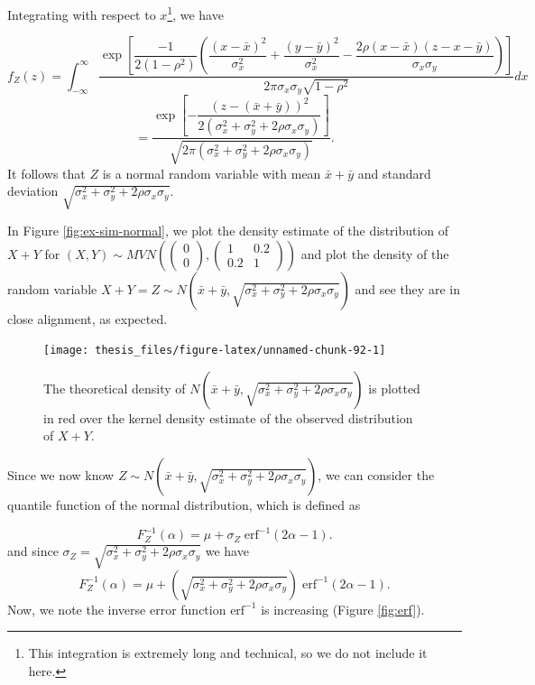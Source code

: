 \documentclass[12pt,twoside]{smiththesis}
\begin{document}
Integrating with respect to \(x\)\footnote{This integration is extremely long and technical, so we do not include it here.}, we have

\[f_Z(z)  = \int_{-\infty}^\infty \dfrac{\exp\left[\dfrac{-1}{2(1-\rho^2)} \left( \dfrac{(x-\bar x)^2}{\sigma_x^2}+\dfrac{(y-\bar y)^2}{\sigma_x^2} - \dfrac{2 \rho (x-\bar x)(z-x-\bar y)}{\sigma_x\sigma_y} \right)\right]}{2\pi \sigma_x \sigma_y \sqrt{1- \rho^2}} dx \]
\[=\dfrac{\exp\left[-\dfrac{(z-(\bar x + \bar y ))^2}{2(\sigma^2_x+\sigma^2_y + 2\rho \sigma_x \sigma_y)}\right]}{\sqrt{2\pi(\sigma_x^2 + \sigma_y^2 + 2\rho \sigma_x \sigma_y)}}.\]
It follows that \(Z\) is a normal random variable with mean \(\bar x + \bar y\) and standard deviation \(\sqrt{\sigma_x^2 +\sigma_y^2 + 2 \rho \sigma_x \sigma_y }\).

In Figure \ref{fig:ex-sim-normal}, we plot the density estimate of the distribution of \(X+Y\) for \((X,Y) \sim MVN\left( \begin{pmatrix} 0\\0 \end{pmatrix}, \begin{pmatrix} 1 & 0.2 \\0.2 & 1 \end{pmatrix}\right)\) and plot the density of the random variable \(X+Y = Z \sim N\left(\bar x + \bar y,\sqrt{\sigma_x^2 +\sigma_y^2 + 2 \rho \sigma_x \sigma_y }\right)\) and see they are in close alignment, as expected.
\begin{figure}

{\centering \texttt{[image: thesis\_files/figure-latex/unnamed-chunk-92-1]} 

}

\caption{\label{fig:ex-sim-normal} The theoretical density of $N\left(\bar x + \bar y,\sqrt{\sigma_x^2 +\sigma_y^2 + 2 \rho \sigma_x \sigma_y }\right)$ is plotted in red over the kernel density estimate of the observed distribution of $X+Y$.}\label{fig:unnamed-chunk-92}
\end{figure}
Since we now know \(Z \sim N\left(\bar x + \bar y,\sqrt{\sigma_x^2 +\sigma_y^2 + 2 \rho \sigma_x \sigma_y }\right)\), we can consider the quantile function of the normal distribution, which is defined as

\[F_Z^{-1}(\alpha)=\mu +\sigma_Z \; \text{erf}^{-1}(2\alpha - 1).\]
and since \(\sigma_Z=\sqrt{\sigma_x^2 +\sigma_y^2 + 2 \rho \sigma_x \sigma_y }\) we have
\[F_Z^{-1}(\alpha)=\mu + \left(\sqrt{\sigma_x^2 +\sigma_y^2 + 2 \rho \sigma_x \sigma_y } \right) \; \text{erf}^{-1}(2\alpha - 1).\]
Now, we note the inverse error function \(\text{erf}^{-1}\) is increasing (Figure \ref{fig:erf}).
\end{document}
